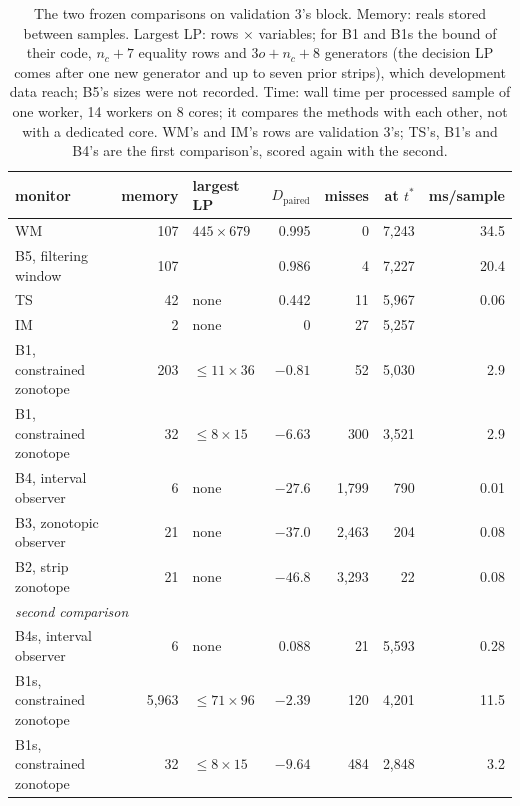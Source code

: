 \documentclass[11pt,a4paper]{article}
\newcommand{\Dp}{D_{\mathrm{paired}}}
\newcommand{\tstar}{t^{\ast}}
\begin{document}
\begin{table}[ht]
\centering\small
\caption{The two frozen comparisons on validation 3's block. Memory: reals stored between samples. Largest LP: rows
$\times$ variables; for B1 and B1s the bound of their code, $n_c+7$ equality rows and $3o+n_c+8$ generators (the decision LP comes
after one new generator and up to seven prior strips), which development data reach; B5's sizes were not recorded. Time: wall time per processed sample of one worker, 14 workers on
8 cores; it compares the methods with each other, not with a dedicated core. WM's and IM's rows are validation 3's;
TS's, B1's and B4's are the first comparison's, scored again with the second.}
\label{tab:baselines}
\begin{tabular}{lrlrrrr}
\toprule
monitor & memory & largest LP & $\Dp$ & misses & at $\tstar$ & ms/sample\\
\midrule
WM & 107 & $445\times679$ & 0.995 & 0 & 7,243 & 34.5\\
B5, filtering window & 107 & & 0.986 & 4 & 7,227 & 20.4\\
TS & 42 & none & 0.442 & 11 & 5,967 & 0.06\\
IM & 2 & none & 0 & 27 & 5,257 & \\
B1, constrained zonotope & 203 & $\le11\times36$ & $-0.81$ & 52 & 5,030 & 2.9\\
B1, constrained zonotope & 32 & $\le8\times15$ & $-6.63$ & 300 & 3,521 & 2.9\\
B4, interval observer & 6 & none & $-27.6$ & 1,799 & 790 & 0.01\\
B3, zonotopic observer & 21 & none & $-37.0$ & 2,463 & 204 & 0.08\\
B2, strip zonotope & 21 & none & $-46.8$ & 3,293 & 22 & 0.08\\
\midrule
\multicolumn{7}{l}{\emph{second comparison}}\\
B4s, interval observer & 6 & none & 0.088 & 21 & 5,593 & 0.28\\
B1s, constrained zonotope & 5,963 & $\le71\times96$ & $-2.39$ & 120 & 4,201 & 11.5\\
B1s, constrained zonotope & 32 & $\le8\times15$ & $-9.64$ & 484 & 2,848 & 3.2\\
\bottomrule
\end{tabular}
\end{table}
\end{document}
